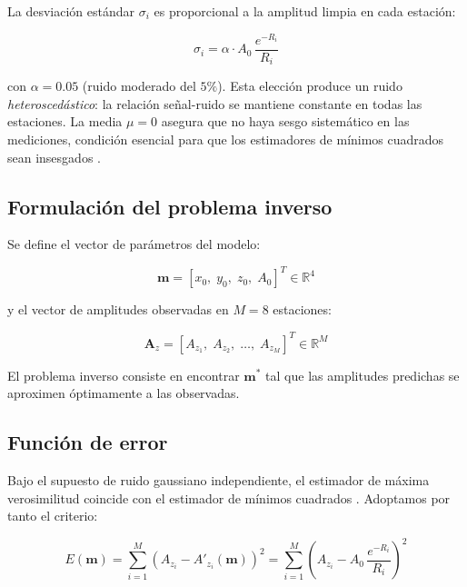 \documentclass[12pt, a4paper]{article}
\begin{document}
La desviación estándar $\sigma_i$ es proporcional a la amplitud limpia
en cada estación:

\begin{equation}
    \sigma_i = \alpha \cdot A_0 \, \frac{e^{-R_i}}{R_i}
    \label{eq:sigma}
\end{equation}

con $\alpha = 0.05$ (ruido moderado del $5\%$). Esta elección produce
un ruido \textit{heteroscedástico}: la relación señal-ruido se mantiene
constante en todas las estaciones. La media $\mu = 0$ asegura que no
haya sesgo sistemático en las mediciones, condición esencial para que
los estimadores de mínimos cuadrados sean insesgados
\cite{menke2018geophysical}.

\subsection{Formulación del problema inverso}

Se define el vector de parámetros del modelo:

\begin{equation}
    \mathbf{m} = [x_0,\; y_0,\; z_0,\; A_0]^T \in \mathbb{R}^4
    \label{eq:parametros}
\end{equation}

y el vector de amplitudes observadas en $M = 8$ estaciones:

\begin{equation}
    \mathbf{A}_z = [A_{z_1},\; A_{z_2},\; \ldots,\; A_{z_M}]^T \in \mathbb{R}^M
    \label{eq:observados}
\end{equation}

El problema inverso consiste en encontrar $\mathbf{m}^*$ tal que las
amplitudes predichas se aproximen óptimamente a las observadas.

\subsection{Función de error}

Bajo el supuesto de ruido gaussiano independiente, el estimador de
máxima verosimilitud coincide con el estimador de mínimos cuadrados
\cite{aster2019parameter, menke2018geophysical}. Adoptamos por tanto
el criterio:

\begin{equation}
    E(\mathbf{m}) = \sum_{i=1}^{M} \left(A_{z_i} - A'_{z_i}(\mathbf{m})\right)^2
    = \sum_{i=1}^{M} \left(A_{z_i} - A_0\,\frac{e^{-R_i}}{R_i}\right)^2
    \label{eq:error}
\end{equation}
\end{document}
